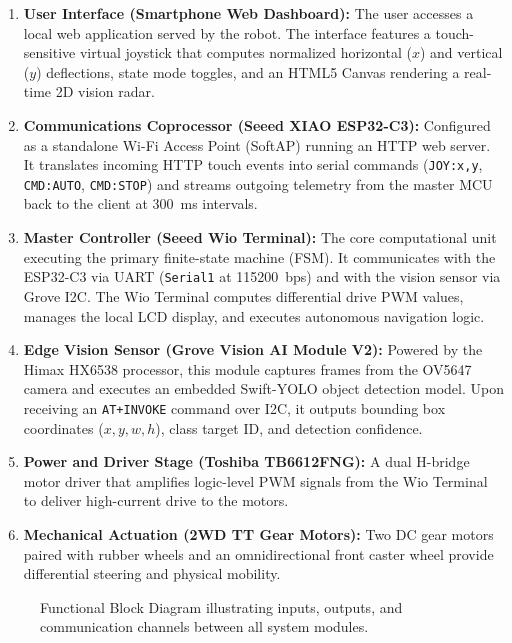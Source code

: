 \documentclass{article}
\begin{document}
\begin{enumerate}
    \item \textbf{User Interface (Smartphone Web Dashboard):} The user accesses a local web application served by the robot. The interface features a touch-sensitive virtual joystick that computes normalized horizontal ($x$) and vertical ($y$) deflections, state mode toggles, and an HTML5 Canvas rendering a real-time 2D vision radar.
    \item \textbf{Communications Coprocessor (Seeed XIAO ESP32-C3):} Configured as a standalone Wi-Fi Access Point (SoftAP) running an HTTP web server. It translates incoming HTTP touch events into serial commands (\texttt{JOY:x,y}, \texttt{CMD:AUTO}, \texttt{CMD:STOP}) and streams outgoing telemetry from the master MCU back to the client at 300~ms intervals.
    \item \textbf{Master Controller (Seeed Wio Terminal):} The core computational unit executing the primary finite-state machine (FSM). It communicates with the ESP32-C3 via UART (\texttt{Serial1} at 115200~bps) and with the vision sensor via Grove I2C. The Wio Terminal computes differential drive PWM values, manages the local LCD display, and executes autonomous navigation logic.
    \item \textbf{Edge Vision Sensor (Grove Vision AI Module V2):} Powered by the Himax HX6538 processor, this module captures frames from the OV5647 camera and executes an embedded Swift-YOLO object detection model. Upon receiving an \texttt{AT+INVOKE} command over I2C, it outputs bounding box coordinates ($x, y, w, h$), class target ID, and detection confidence.
    \item \textbf{Power and Driver Stage (Toshiba TB6612FNG):} A dual H-bridge motor driver that amplifies logic-level PWM signals from the Wio Terminal to deliver high-current drive to the motors.
    \item \textbf{Mechanical Actuation (2WD TT Gear Motors):} Two DC gear motors paired with rubber wheels and an omnidirectional front caster wheel provide differential steering and physical mobility.
\end{enumerate}

\begin{figure}[htbp]
    \centering
    \caption{Functional Block Diagram illustrating inputs, outputs, and communication channels between all system modules.}
    \label{fig:block_diagram}
\end{figure}
\end{document}
